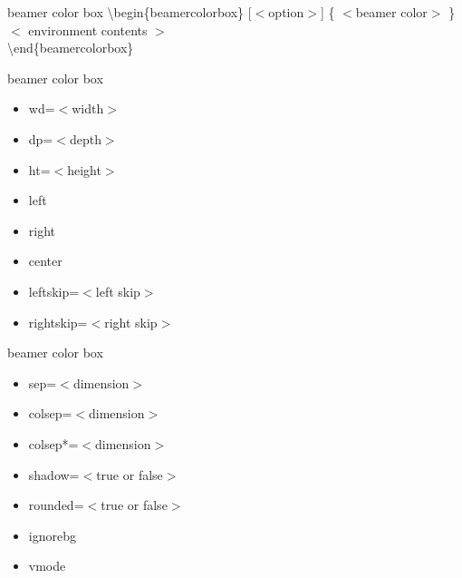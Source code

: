 \documentclass[ aspectratio=169,  10pt,blue,xcolor=pdftex,dvipsnames,table,handout,notes]{beamer}
\begin{document}

		\begin{frame}[plain]
		\end{frame}


		\begin{frame}[allowframebreaks]

		\null
		\begin{block} {beamer color box}
			\textbackslash begin\{beamercolorbox\} [$<$option$>$] \{ $<$beamer color$>$ \}\\
			$<$ environment contents $>$ \\
			\textbackslash end\{beamercolorbox\}
		\end{block}

		\newpage \null
		\begin{block} {beamer color box}
			\begin{itemize}	
			\item	wd=$<$width$>$
			\item	dp=$<$depth$>$
			\item	ht=$<$height$>$
			\item	left
			\item	right
			\item	center
			\item	leftskip=$<$left skip$>$
			\item	rightskip=$<$right skip$>$
			\end{itemize}
		\end{block}

		\newpage \null
		\begin{block} {beamer color box}
			\begin{itemize}	
			\item	sep=$<$dimension$>$
			\item	colsep=$<$dimension$>$
			\item	colsep*=$<$dimension$>$
			\item	shadow=$<$true or false$>$
			\item	rounded=$<$true or false$>$
			\item	ignorebg
			\item	vmode
			\end{itemize}
		\end{block}

		\end{frame}
\end{document}
